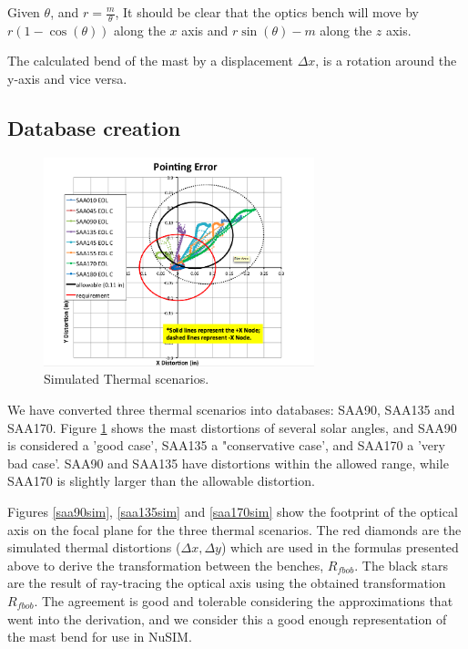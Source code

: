 Given $\theta$, and $r = \frac{m}{\theta}$, It should be clear that the optics bench will move by $r\left(1-\cos\left(\theta\right)\right)$ along the $x$ axis and $r\sin\left(\theta\right)-m$ along the $z$ axis. 

The calculated bend of the mast by a displacement $\Delta x$, is a rotation around the y-axis and vice versa.

\subsection{Database creation}

\begin{figure}[tb]
\begin{center}
\includegraphics[width=0.7\textwidth]{images/mastdb.png}
\caption{Simulated Thermal scenarios.}
\label{mastdb}
\end{center}
\end{figure}

We have converted three thermal scenarios into databases: SAA90, SAA135 and SAA170. Figure \ref{mastdb} shows the mast distortions of several solar angles, and SAA90 is considered a 'good case', SAA135 a "conservative case', and SAA170 a 'very bad case'. SAA90 and SAA135 have distortions within the allowed range, while SAA170 is slightly larger than the allowable distortion.

Figures \ref{saa90sim}, \ref{saa135sim} and \ref{saa170sim} show the footprint of the optical axis on the focal plane for the three thermal scenarios. The red diamonds are the simulated thermal distortions ($\Delta x, \Delta y$) which are used in the formulas presented above to derive the transformation between the benches, $R_{fbob}$. The black stars are the result of ray-tracing the optical axis using the obtained transformation $R_{fbob}$.  The agreement is good and tolerable considering the approximations that went into the derivation, and we consider this a good enough representation of the mast bend for use in NuSIM.

